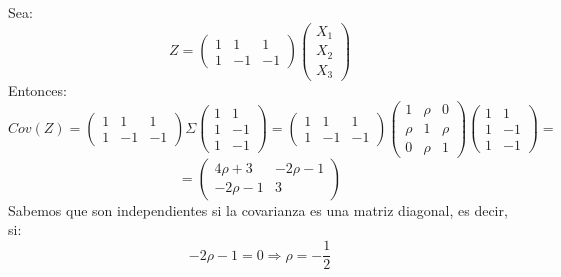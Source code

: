 \documentclass[11pt,a4paper]{article}
\begin{document}
Sea:
$$Z = \begin{pmatrix}
1 & 1 & 1 \\
1 & -1 & -1
\end{pmatrix} \begin{pmatrix}
X_{1} \\
X_{2} \\
X_{3}
\end{pmatrix}$$
Entonces:
$$Cov(Z) = \begin{pmatrix}
1 & 1 & 1 \\
1 & -1 & -1
\end{pmatrix} \Sigma \begin{pmatrix}
1 & 1 \\
1 & -1 \\
1 & -1
\end{pmatrix} = \begin{pmatrix}
1 & 1 & 1 \\
1 & -1 & -1
\end{pmatrix} \begin{pmatrix}
1 & \rho & 0 \\
\rho & 1 & \rho \\
0 & \rho & 1
\end{pmatrix} \begin{pmatrix}
1 & 1 \\
1 & -1 \\
1 & -1
\end{pmatrix} =$$
$$= \begin{pmatrix}
4\rho+3 & -2\rho-1 \\
-2\rho-1 & 3
\end{pmatrix}$$
Sabemos que son independientes si la covarianza es una matriz diagonal, es decir, si:
$$-2\rho-1 = 0 \Rightarrow \rho = -\frac{1}{2}$$
\end{document}
